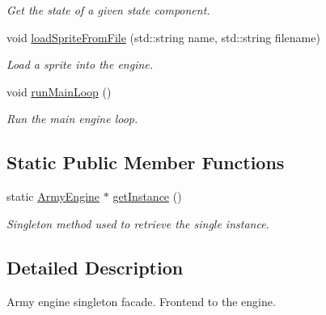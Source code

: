 \begin{DoxyCompactItemize}
\begin{DoxyCompactList}\small\item\em Get the state of a given state component. \end{DoxyCompactList}\item 
\hypertarget{class_army_engine_ad06c2c6098a0879320228e4925e4c8b1}{void \hyperlink{class_army_engine_ad06c2c6098a0879320228e4925e4c8b1}{load\-Sprite\-From\-File} (std\-::string name, std\-::string filename)}\label{d4/d9d/class_army_engine_ad06c2c6098a0879320228e4925e4c8b1}

\begin{DoxyCompactList}\small\item\em Load a sprite into the engine. \end{DoxyCompactList}\item 
\hypertarget{class_army_engine_a4e3bffed9fad4456a318282b8d1d9388}{void \hyperlink{class_army_engine_a4e3bffed9fad4456a318282b8d1d9388}{run\-Main\-Loop} ()}\label{d4/d9d/class_army_engine_a4e3bffed9fad4456a318282b8d1d9388}

\begin{DoxyCompactList}\small\item\em Run the main engine loop. \end{DoxyCompactList}\end{DoxyCompactItemize}
\subsection*{Static Public Member Functions}
\begin{DoxyCompactItemize}
\item 
static \hyperlink{class_army_engine}{Army\-Engine} $\ast$ \hyperlink{class_army_engine_a6402377a6f304aea19cc746332028b67}{get\-Instance} ()
\begin{DoxyCompactList}\small\item\em Singleton method used to retrieve the single instance. \end{DoxyCompactList}\end{DoxyCompactItemize}


\subsection{Detailed Description}
Army engine singleton facade. Frontend to the engine. 

